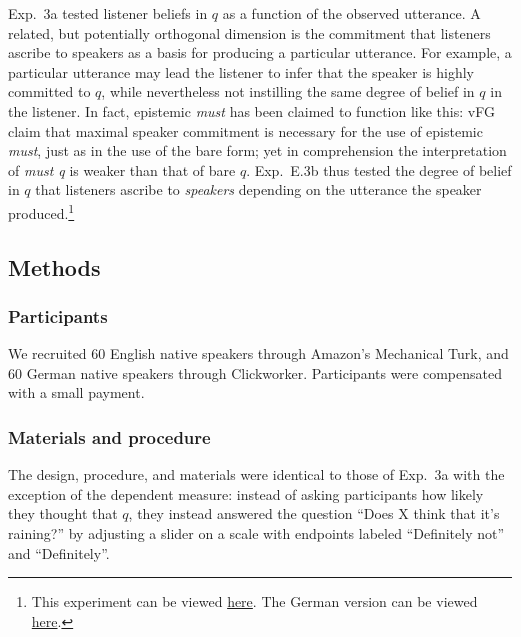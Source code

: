\documentclass[11pt]{article}
\begin{document}

Exp.~3a tested listener beliefs in $q$ as a function of the observed utterance. A related, but potentially orthogonal dimension is the commitment that listeners ascribe to speakers as a basis for producing a particular utterance. For example, a particular utterance may lead the listener to infer that the speaker is highly committed to $q$, while nevertheless not instilling the same degree of belief in $q$ in the listener. In fact, epistemic \emph{must} has been claimed to function like this: vFG claim that maximal speaker commitment is necessary for the use of epistemic \emph{must}, just as in the use of the bare form; yet in comprehension the interpretation of \emph{must q} is weaker than that of bare $q$.  Exp.~E.3b thus tested the degree of belief in $q$ that listeners ascribe to \emph{speakers} depending on the utterance the speaker produced.\footnote{This experiment can be viewed \href{http://stanford.edu/~jdegen/80_modals_comprehension_speakerbelief/modals.html}{here}. The German version can be viewed \href{http://web.stanford.edu/~jdegen/cgi-bin/1_dp_comprehension_speakerbelief/discourse_particles.html}{here}.}

\subsection{Methods}

\subsubsection{Participants}

We recruited 60 English native speakers through Amazon's Mechanical Turk, and 60 German native speakers through Clickworker. Participants were compensated with a small payment.

\subsubsection{Materials and procedure}

The design, procedure, and materials were identical to those of Exp.~3a with the exception of the dependent measure: instead of asking participants how likely they thought that $q$, they instead answered the question ``Does X think that it's raining?'' by adjusting a slider on a scale with endpoints labeled ``Definitely not'' and ``Definitely''. 
\end{document}
